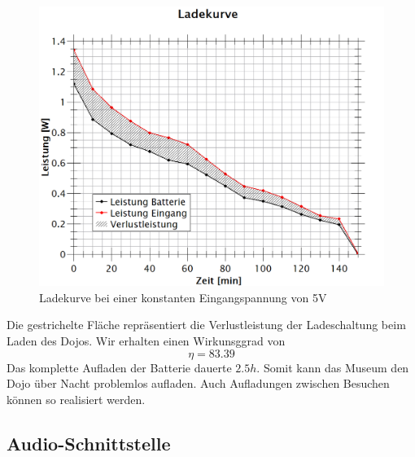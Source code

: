 \begin{figure}[h]
	\centering
	\includegraphics[width=\textwidth]{graphics/ladekurve.png}
	\caption{Ladekurve bei einer konstanten Eingangspannung von 5V}
	\label{fig:Ladeleistung}
\end{figure}

Die gestrichelte Fläche repräsentiert die Verlustleistung der Ladeschaltung beim Laden des Dojos.
Wir erhalten einen Wirkunsggrad von
\begin{equation}
\eta = 83.39%
\end{equation}
Das komplette Aufladen der Batterie dauerte $2.5h$. Somit kann das Museum den Dojo über Nacht problemlos aufladen. Auch Aufladungen zwischen Besuchen können so realisiert werden.
\clearpage



\subsection{Audio-Schnittstelle}\label{sec:AUDIO}


